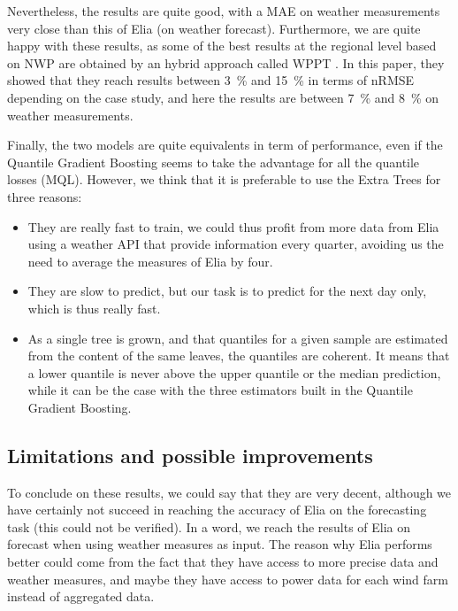 \documentclass[a4paper, 12pt]{article}
\begin{document}
	Nevertheless, the results are quite good, with a MAE on weather measurements very close than this of Elia (on weather forecast). Furthermore, we are quite happy with these results, as some of the best results at the regional level based on NWP are obtained by an hybrid approach called WPPT \parencite{croonenbroeck2014windpower}. In this paper, they showed that they reach results between \SI{3}{\percent} and \SI{15}{\percent} in terms of nRMSE depending on the case study, and here the results are between \SI{7}{\percent} and \SI{8}{\percent} on weather measurements.
		
	Finally, the two models are quite equivalents in term of performance, even if the Quantile Gradient Boosting seems to take the advantage for all the quantile losses (MQL). However, we think that it is preferable to use the Extra Trees for three reasons:
	\begin{itemize}
		\item They are really fast to train, we could thus profit from more data from Elia using a weather API that provide information every quarter, avoiding us the need to average the measures of Elia by four.
		\item They are slow to predict, but our task is to predict for the next day only, which is thus really fast.
		\item As a single tree is grown, and that quantiles for a given sample are estimated from the content of the same leaves, the quantiles are coherent. It means that a lower quantile is never above the upper quantile or the median prediction, while it can be the case with the three estimators built in the Quantile Gradient Boosting.
	\end{itemize}

\subsection{Limitations and possible improvements}

	To conclude on these results, we could say that they are very decent, although we have certainly not succeed in reaching the accuracy of Elia on the forecasting task (this could not be verified). In a word, we reach the results of Elia on forecast when using weather measures as input. The reason why Elia performs better could come from the fact that they have access to more precise data and weather measures, and maybe they have access to power data for each wind farm instead of aggregated data.
	
\end{document}
